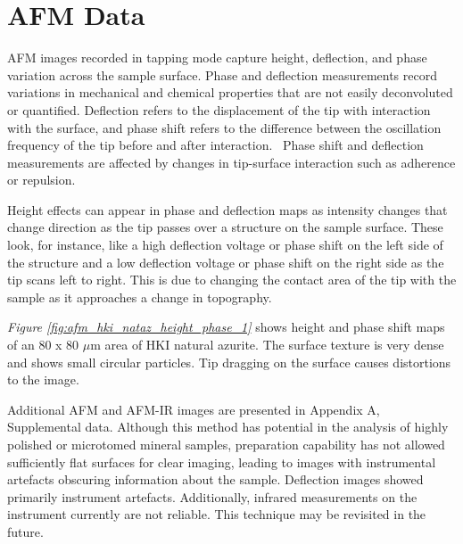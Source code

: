 


\section[AFM Data]{AFM Data}
\label{section3.4}


AFM images recorded in tapping mode capture height, deflection, and phase variation across the sample surface. Phase and deflection measurements record variations in mechanical and chemical properties that are not easily deconvoluted or quantified. Deflection refers to the displacement of the tip with interaction with the surface, and phase shift refers to the difference between the oscillation frequency of the tip before and after interaction.~\autocite{iscpi} Phase shift and deflection measurements are affected by changes in tip-surface interaction such as adherence or repulsion. 

Height effects can appear in phase and deflection maps as intensity changes that change direction as the tip passes over a structure on the sample surface. These look, for instance, like a high deflection voltage or phase shift on the left side of the structure and a low deflection voltage or phase shift on the right side as the tip scans left to right. This is due to changing the contact area of the tip with the sample as it approaches a change in topography.~\autocite{iscpi} 

\textit{Figure \ref{fig:afm_hki_nataz_height_phase_1}} shows height and phase shift maps of an 80 x 80 $\mu$m area of HKI natural azurite. The surface texture is very dense and shows small circular particles. Tip dragging on the surface causes distortions to the image. 

Additional AFM and AFM-IR images are presented in Appendix A, Supplemental data. Although this method has potential in the analysis of highly polished or microtomed mineral samples, preparation capability has not allowed sufficiently flat surfaces for clear imaging, leading to images with instrumental artefacts obscuring information about the sample. Deflection images showed primarily instrument artefacts. Additionally, infrared measurements on the instrument currently are not reliable. This technique may be revisited in the future.

